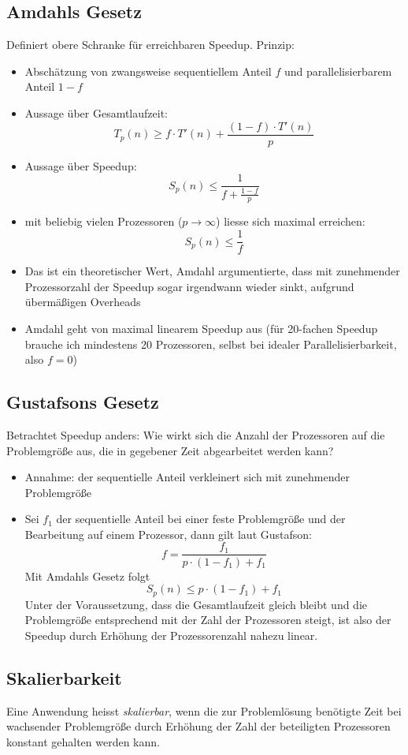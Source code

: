 \documentclass[a4paper, 12pt]{article}
\begin{document}
\subsection{Amdahls Gesetz}
Definiert obere Schranke für erreichbaren Speedup. Prinzip:
\begin{itemize}
  \item Abschätzung von zwangsweise sequentiellem Anteil \(f\) und parallelisierbarem Anteil \(1-f\)
  \item Aussage über Gesamtlaufzeit:
    \[
    T_p(n)\ge f\cdot T'(n) + \frac{(1-f)\cdot T'(n)}{p}
    \]
  \item Aussage über Speedup:
    \[S_p(n)\le\frac{1}{f+\frac{1-f}{p}}\]
  \item mit beliebig vielen Prozessoren (\(p\rightarrow\infty\)) liesse sich maximal erreichen:
    \[S_p(n)\le \frac{1}{f}\]
  \item Das ist ein theoretischer Wert, Amdahl argumentierte, dass mit zunehmender Prozessorzahl der Speedup sogar irgendwann wieder sinkt, aufgrund übermäßigen Overheads
  \item Amdahl geht von maximal linearem Speedup aus (für 20-fachen Speedup brauche ich mindestens 20 Prozessoren, selbst bei idealer Parallelisierbarkeit, also \(f=0\))
\end{itemize}


\subsection{Gustafsons Gesetz}
Betrachtet Speedup anders: Wie wirkt sich die Anzahl der Prozessoren auf die Problemgröße aus, die in gegebener Zeit abgearbeitet werden kann?
\begin{itemize}
  \item Annahme: der sequentielle Anteil verkleinert sich mit zunehmender Problemgröße
  \item Sei \(f_1\) der sequentielle Anteil bei einer feste Problemgröße und der Bearbeitung auf einem Prozessor, dann gilt laut Gustafson:
    \[f=\frac{f_1}{p\cdot (1-f_1) +f_1}\]
    Mit Amdahls Gesetz folgt
    \[S_p(n)\le p\cdot (1-f_1)+f_1\]
    Unter der Voraussetzung, dass die Gesamtlaufzeit gleich bleibt und die Problemgröße entsprechend mit der Zahl der Prozessoren steigt, ist also der Speedup durch Erhöhung der Prozessorenzahl nahezu linear.
\end{itemize}


\subsection{Skalierbarkeit}
Eine Anwendung heisst \emph{skalierbar}, wenn die zur Problemlösung benötigte Zeit bei wachsender Problemgröße durch Erhöhung der Zahl der beteiligten Prozessoren konstant gehalten werden kann.
\end{document}

